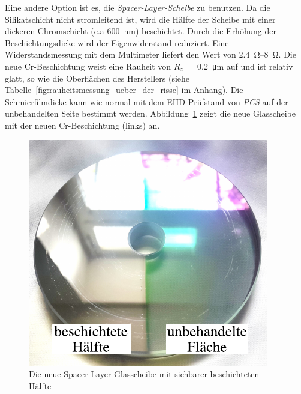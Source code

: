 Eine andere Option ist es, die \textit{Spacer-Layer-Scheibe} zu benutzen.
Da die Silikatschicht nicht stromleitend ist, wird die Hälfte der Scheibe mit einer dickeren Chromschicht (c.a \SI{600}{\nano\meter}) beschichtet.
Durch die Erhöhung der Beschichtungsdicke wird der Eigenwiderstand reduziert.
Eine Widerstandsmessung mit dem Multimeter liefert den Wert von \SIrange{2.4}{8}{\ohm}.
Die neue Cr-Beschichtung weist eine Rauheit von $R_z =$ \SI{0.2}{\um}  auf und ist relativ glatt, so wie die Oberflächen des Herstellers (siehe Tabelle~\ref{fig:rauheitsmessung_ueber_der_risse} im Anhang).
Die Schmierfilmdicke kann wie normal mit dem EHD-Prüfstand von \textit{PCS} auf der unbehandelten Seite bestimmt werden.
Abbildung~\ref{fig:die_neu_beschichtet_glassscheibe} zeigt die neue Glasscheibe mit der neuen Cr-Beschichtung (links) an.

\begin{figure}[htb]
    \centering
    \includegraphics[]{./images/beschichtete_scheibe.pdf}
    \caption{Die neue Spacer-Layer-Glasscheibe mit sichbarer beschichteten Hälfte}
    \label{fig:die_neu_beschichtet_glassscheibe}
\end{figure}

